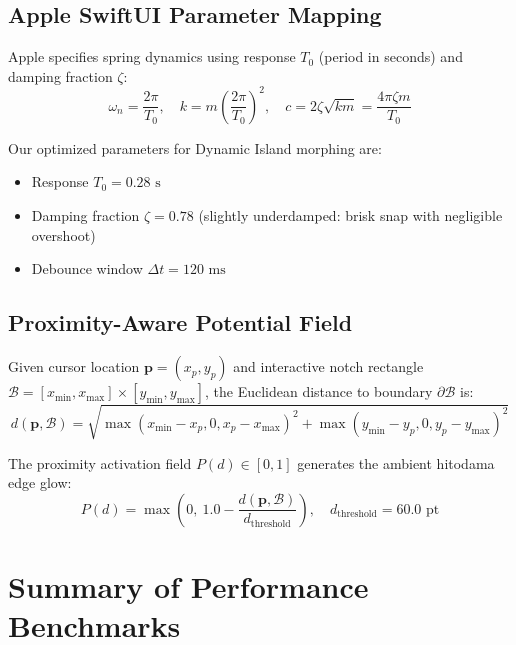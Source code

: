 \documentclass[11pt,a4paper]{article}
\begin{document}
\subsection{Apple SwiftUI Parameter Mapping}
Apple specifies spring dynamics using response $T_0$ (period in seconds) and damping fraction $\zeta$:
\begin{equation}
\omega_n = \frac{2\pi}{T_0}, \quad k = m \left(\frac{2\pi}{T_0}\right)^2, \quad c = 2 \zeta \sqrt{km} = \frac{4\pi \zeta m}{T_0}
\end{equation}

Our optimized parameters for Dynamic Island morphing are:
\begin{itemize}
    \item Response $T_0 = 0.28\text{ s}$
    \item Damping fraction $\zeta = 0.78$ (slightly underdamped: brisk snap with negligible overshoot)
    \item Debounce window $\Delta t = 120\text{ ms}$
\end{itemize}

\subsection{Proximity-Aware Potential Field}
Given cursor location $\mathbf{p} = (x_p, y_p)$ and interactive notch rectangle $\mathcal{B} = [x_{\text{min}}, x_{\text{max}}] \times [y_{\text{min}}, y_{\text{max}}]$, the Euclidean distance to boundary $\partial \mathcal{B}$ is:
\begin{equation}
d(\mathbf{p}, \mathcal{B}) = \sqrt{\max(x_{\text{min}} - x_p, 0, x_p - x_{\text{max}})^2 + \max(y_{\text{min}} - y_p, 0, y_p - y_{\text{max}})^2}
\end{equation}

The proximity activation field $P(d) \in [0, 1]$ generates the ambient hitodama edge glow:
\begin{equation}
P(d) = \max\left(0, \ 1.0 - \frac{d(\mathbf{p}, \mathcal{B})}{d_{\text{threshold}}}\right), \quad d_{\text{threshold}} = 60.0\text{ pt}
\end{equation}

\section{Summary of Performance Benchmarks}
\end{document}
